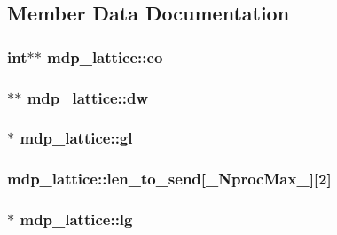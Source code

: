 \subsection{Member Data Documentation}
\hypertarget{classmdp__lattice_ad4cffbef2302b39176943a783c8f4ecc}{
\subsubsection[{co}]{\setlength{\rightskip}{0pt plus 5cm}int$\ast$$\ast$ {\bf mdp\_\-lattice::co}}}
\label{classmdp__lattice_ad4cffbef2302b39176943a783c8f4ecc}
\hypertarget{classmdp__lattice_a5fb45161a272c08b81eafca224546673}{
\subsubsection[{dw}]{$\ast$$\ast$ {\bf mdp\_\-lattice::dw}}}
\label{classmdp__lattice_a5fb45161a272c08b81eafca224546673}
\hypertarget{classmdp__lattice_aac1057478186764ece27e33d1a215a7d}{
\subsubsection[{gl}]{$\ast$ {\bf mdp\_\-lattice::gl}}}
\label{classmdp__lattice_aac1057478186764ece27e33d1a215a7d}
\hypertarget{classmdp__lattice_a493c53cf3e42ff9524ce36f07feb427e}{
\subsubsection[{len\_\-to\_\-send}]{ {\bf mdp\_\-lattice::len\_\-to\_\-send}\mbox{[}{\bf \_\-NprocMax\_\-}\mbox{]}\mbox{[}2\mbox{]}}}
\label{classmdp__lattice_a493c53cf3e42ff9524ce36f07feb427e}
\hypertarget{classmdp__lattice_a1f2238902be88b61a3cc677f912210ea}{
\subsubsection[{lg}]{$\ast$ {\bf mdp\_\-lattice::lg}}}

